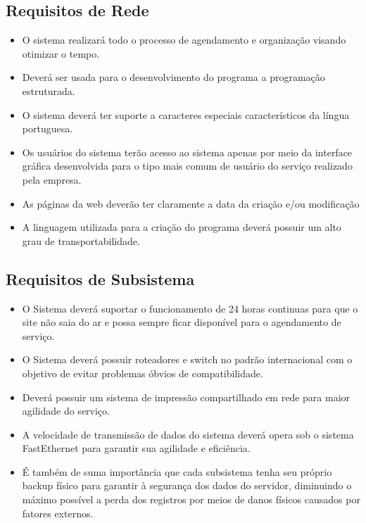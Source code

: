    \subsection{Requisitos de Rede}
     \begin{itemize}
     \item	O sistema realizará todo o processo de agendamento e organização visando otimizar o tempo.
     \item	Deverá ser usada para o desenvolvimento do programa a programação estruturada.
     \item	O sistema deverá ter suporte a caracteres especiais característicos da língua portuguesa.
     \item	Os usuários do sistema terão acesso ao sistema apenas por meio da interface gráfica desenvolvida para o tipo mais comum de usuário do serviço realizado pela empresa.
     \item	As páginas da web deverão ter claramente a data da criação e/ou modificação
     \item	A linguagem utilizada para a criação do programa deverá possuir um alto grau de transportabilidade.
     \end{itemize}
        
 
     \subsection{Requisitos de Subsistema}
      \begin{itemize}
      \item	O Sistema deverá suportar o funcionamento de 24 horas continuas para que o site não saia do ar e possa sempre ficar disponível para o agendamento de serviço.
      \item	O Sistema deverá possuir roteadores e switch no padrão internacional com o objetivo de evitar problemas óbvios de compatibilidade.
      \item	Deverá possuir um sistema de impressão compartilhado em rede para maior agilidade do serviço.
      \item	A velocidade de transmissão de dados do sistema deverá opera sob o sistema FastEthernet para garantir sua agilidade e eficiência.
      \item	É também de suma importância que cada subsistema tenha seu próprio backup físico para garantir à segurança dos dados do servidor, diminuindo o máximo possível a perda dos registros por meios de danos físicos causados por fatores externos.
      \end{itemize}

